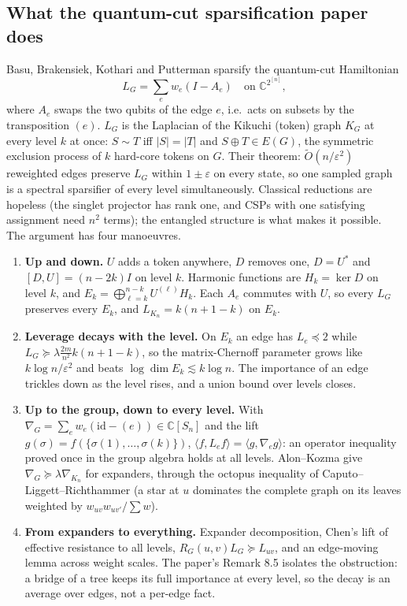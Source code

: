 \label{sec:kikuchi}
\subsection{What the quantum-cut sparsification paper does}
Basu, Brakensiek, Kothari and Putterman \cite{BBKP} sparsify the quantum-cut Hamiltonian
\[L_G=\textstyle\sum_ew_e(I-A_e)\quad\text{on }\mathbb C^{2^{[n]}},\]
where $A_e$ swaps the two qubits of the edge $e$, i.e.\ acts on subsets by the
transposition $(e)$. $L_G$ is the Laplacian of the Kikuchi (token) graph $K_G$ at every level $k$ at once: $S\sim T$ iff $|S|=|T|$ and
$S\oplus T\in E(G)$, the symmetric exclusion process of $k$ hard-core tokens on $G$. Their theorem: $\tilde O(n/\varepsilon^2)$ reweighted edges
preserve $L_G$ within $1\pm\varepsilon$ on every state, so one sampled graph is a spectral sparsifier of every level simultaneously.
Classical reductions are hopeless (the singlet projector has rank one, and CSPs with one satisfying assignment need $n^2$ terms);
the entangled structure is what makes it possible. The argument has four manoeuvres.
\begin{enumerate}[leftmargin=*]
\item \textbf{Up and down.} $U$ adds a token anywhere, $D$ removes one, $D=U^*$ and $[D,U]=(n-2k)I$ on level $k$. Harmonic functions are
$H_k=\ker D$ on level $k$, and $E_k=\bigoplus_{\ell=k}^{n-k}U^{(\ell)}H_k$. Each $A_e$ commutes with $U$, so every $L_G$ preserves every $E_k$, and
$L_{K_n}=k(n+1-k)$ on $E_k$.
\item \textbf{Leverage decays with the level.} On $E_k$ an edge has $L_e\preceq2$ while $L_G\succeq\lambda\frac{2m}{n^2}k(n+1-k)$, so the
matrix-Chernoff parameter grows like $k\log n/\varepsilon^2$ and beats $\log\dim E_k\lesssim k\log n$. The importance of an edge
trickles down as the level rises, and a union bound over levels closes.
\item \textbf{Up to the group, down to every level.} With $\nabla_G=\sum_ew_e(\mathrm{id}-(e))\in\mathbb C[S_n]$ and the lift $g(\sigma)=f(\{\sigma(1),\dots,\sigma(k)\})$,
$\langle f,L_ef\rangle=\langle g,\nabla_eg\rangle$: an operator inequality proved once in the group algebra holds at all levels. Alon--Kozma
give $\nabla_G\succeq\lambda\nabla_{K_n}$ for expanders, through the octopus inequality of Caputo--Liggett--Richthammer (a star at $u$
dominates the complete graph on its leaves weighted by $w_{uv}w_{uv'}/\sum w$).
\item \textbf{From expanders to everything.} Expander decomposition, Chen's lift of effective resistance to all levels,
$R_G(u,v)L_G\succeq L_{uv}$, and an edge-moving lemma across weight scales. The paper's Remark 8.5 isolates the obstruction: a bridge of
a tree keeps its full importance at every level, so the decay is an average over edges, not a per-edge fact.
\end{enumerate}

